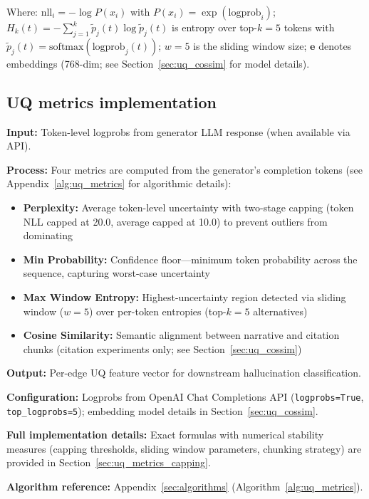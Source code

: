\noindent Where: $\mathrm{nll}_i = -\log P(x_i)$ with $P(x_i) = \exp(\mathrm{logprob}_i)$; $H_k(t) = -\sum_{j=1}^{k}\tilde{p}_j(t)\log \tilde{p}_j(t)$ is entropy over top-$k{=}5$ tokens with $\tilde{p}_j(t) = \mathrm{softmax}(\mathrm{logprob}_j(t))$; $w{=}5$ is the sliding window size; $\mathbf{e}$ denotes embeddings (768-dim; see Section~\ref{sec:uq_cossim} for model details).

\subsection{UQ metrics implementation}
\label{sec:uq_metrics_implementation}
\textbf{Input:} Token-level logprobs from generator LLM response (when available via API).

\textbf{Process:} Four metrics are computed from the generator's completion tokens (see Appendix~\ref{alg:uq_metrics} for algorithmic details):
\begin{itemize}[noitemsep]
    \item \textbf{Perplexity:} Average token-level uncertainty with two-stage capping (token NLL capped at 20.0, average capped at 10.0) to prevent outliers from dominating
    \item \textbf{Min Probability:} Confidence floor---minimum token probability across the sequence, capturing worst-case uncertainty
    \item \textbf{Max Window Entropy:} Highest-uncertainty region detected via sliding window ($w{=}5$) over per-token entropies (top-$k{=}5$ alternatives)
    \item \textbf{Cosine Similarity:} Semantic alignment between narrative and citation chunks (citation experiments only; see Section~\ref{sec:uq_cossim})
\end{itemize}

\textbf{Output:} Per-edge UQ feature vector for downstream hallucination classification.

\textbf{Configuration:} Logprobs from OpenAI Chat Completions API (\texttt{logprobs=True}, \texttt{top\_logprobs=5}); embedding model details in Section~\ref{sec:uq_cossim}.

\textbf{Full implementation details:} Exact formulas with numerical stability measures (capping thresholds, sliding window parameters, chunking strategy) are provided in Section~\ref{sec:uq_metrics_capping}.

\textbf{Algorithm reference:} Appendix~\ref{sec:algorithms} (Algorithm~\ref{alg:uq_metrics}).

